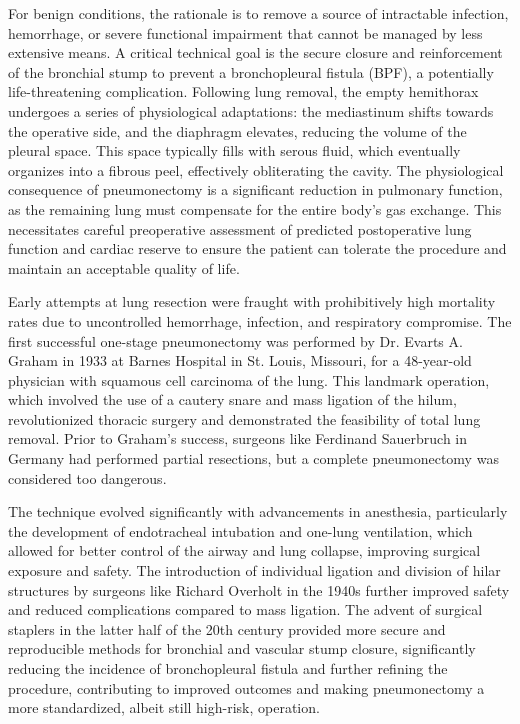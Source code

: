 For benign conditions, the rationale is to remove a source of intractable infection, hemorrhage, or severe functional impairment that cannot be managed by less extensive means. A critical technical goal is the secure closure and reinforcement of the bronchial stump to prevent a bronchopleural fistula (BPF), a potentially life-threatening complication. Following lung removal, the empty hemithorax undergoes a series of physiological adaptations: the mediastinum shifts towards the operative side, and the diaphragm elevates, reducing the volume of the pleural space. This space typically fills with serous fluid, which eventually organizes into a fibrous peel, effectively obliterating the cavity. The physiological consequence of pneumonectomy is a significant reduction in pulmonary function, as the remaining lung must compensate for the entire body's gas exchange. This necessitates careful preoperative assessment of predicted postoperative lung function and cardiac reserve to ensure the patient can tolerate the procedure and maintain an acceptable quality of life.

Early attempts at lung resection were fraught with prohibitively high mortality rates due to uncontrolled hemorrhage, infection, and respiratory compromise. The first successful one-stage pneumonectomy was performed by Dr. Evarts A. Graham in 1933 at Barnes Hospital in St. Louis, Missouri, for a 48-year-old physician with squamous cell carcinoma of the lung. This landmark operation, which involved the use of a cautery snare and mass ligation of the hilum, revolutionized thoracic surgery and demonstrated the feasibility of total lung removal. Prior to Graham's success, surgeons like Ferdinand Sauerbruch in Germany had performed partial resections, but a complete pneumonectomy was considered too dangerous.

The technique evolved significantly with advancements in anesthesia, particularly the development of endotracheal intubation and one-lung ventilation, which allowed for better control of the airway and lung collapse, improving surgical exposure and safety. The introduction of individual ligation and division of hilar structures by surgeons like Richard Overholt in the 1940s further improved safety and reduced complications compared to mass ligation. The advent of surgical staplers in the latter half of the 20th century provided more secure and reproducible methods for bronchial and vascular stump closure, significantly reducing the incidence of bronchopleural fistula and further refining the procedure, contributing to improved outcomes and making pneumonectomy a more standardized, albeit still high-risk, operation.

